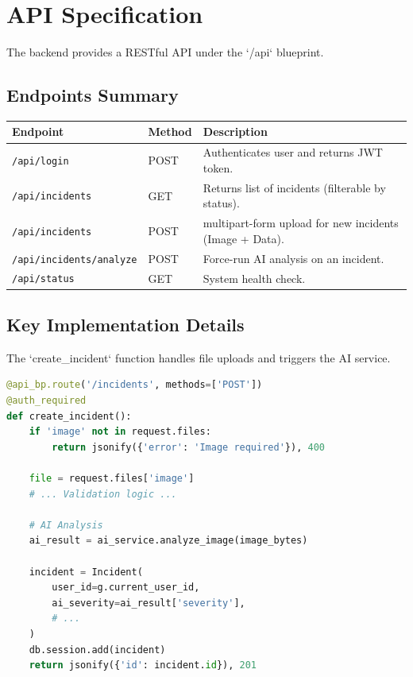\documentclass[12pt,a4paper]{article}
\begin{document}
\section{API Specification}
The backend provides a RESTful API under the `/api` blueprint.

\subsection{Endpoints Summary}
\begin{longtable}{|p{4cm}|p{2cm}|p{8cm}|}
    \hline
    \textbf{Endpoint} & \textbf{Method} & \textbf{Description} \\
    \hline
    \endhead
    \texttt{/api/login} & POST & Authenticates user and returns JWT token. \\
    \hline
    \texttt{/api/incidents} & GET & Returns list of incidents (filterable by status). \\
    \hline
    \texttt{/api/incidents} & POST & multipart-form upload for new incidents (Image + Data). \\
    \hline
    \texttt{/api/incidents/analyze} & POST & Force-run AI analysis on an incident. \\
    \hline
    \texttt{/api/status} & GET & System health check. \\
    \hline
\end{longtable}

\subsection{Key Implementation Details}
The `create_incident` function handles file uploads and triggers the AI service.

\begin{lstlisting}[language=Python, caption={Creation Logic in app/blueprints/api.py}]
@api_bp.route('/incidents', methods=['POST'])
@auth_required
def create_incident():
    if 'image' not in request.files:
        return jsonify({'error': 'Image required'}), 400
    
    file = request.files['image']
    # ... Validation logic ...
    
    # AI Analysis
    ai_result = ai_service.analyze_image(image_bytes)
    
    incident = Incident(
        user_id=g.current_user_id,
        ai_severity=ai_result['severity'],
        # ...
    )
    db.session.add(incident)
    return jsonify({'id': incident.id}), 201
\end{lstlisting}
\end{document}
